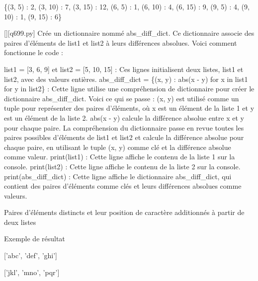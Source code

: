 \{(3, 5) : 2, (3, 10) : 7, (3, 15) : 12, (6, 5) : 1, (6, 10) : 4, (6, 15) : 9, (9, 5) : 4, (9, 10) : 1, (9, 15) : 6\}
        \par
        \begin{solution}
            \renewcommand{\nomfichier}{q699.py}
            \pythonfile{\chemincode \nomfichier}[][\nomfichier]
            Crée un dictionnaire nommé abs\_diff\_dict. Ce dictionnaire associe des paires d'éléments de list1 et list2 à leurs différences absolues. Voici comment fonctionne le code :

    list1 = [3, 6, 9] et list2 = [5, 10, 15] : Ces lignes initialisent deux listes, list1 et list2, avec des valeurs entières.
    abs\_diff\_dict = \{(x, y) : abs(x - y) for x in list1 for y in list2\} : Cette ligne utilise une compréhension de dictionnaire pour créer le dictionnaire abs\_diff\_dict. Voici ce qui se passe :
        (x, y) est utilisé comme un tuple pour représenter des paires d'éléments, où x est un élément de la liste 1 et y est un élément de la liste 2.
        abs(x - y) calcule la différence absolue entre x et y pour chaque paire.
        La compréhension du dictionnaire passe en revue toutes les paires possibles d'éléments de list1 et list2 et calcule la différence absolue pour chaque paire, en utilisant le tuple (x, y) comme clé et la différence absolue comme valeur.
    print(list1) : Cette ligne affiche le contenu de la liste 1 sur la console.
    print(list2) : Cette ligne affiche le contenu de la liste 2 sur la console.
    print(abs\_diff\_dict) : Cette ligne affiche le dictionnaire abs\_diff\_dict, qui contient des paires d'éléments comme clés et leurs différences absolues comme valeurs.
        \end{solution}
        

        \question
        Paires d'éléments distincts et leur position de caractère additionnés à partir de deux listes

Exemple de résultat

['abc', 'def', 'ghi']

['jkl', 'mno', 'pqr']

